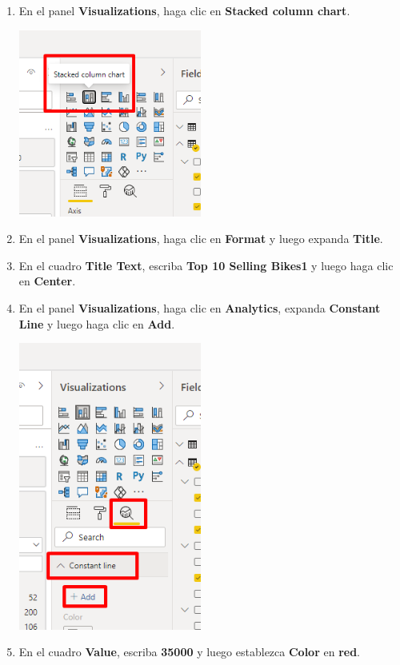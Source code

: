 \documentclass[12pt,letterpaper]{article}
\newcommand\tab[1][1cm]{\hspace*{#1}}
\begin{document}
\begin{enumerate}[\tab 1.]
\begin{center}
        \end{center}
        \item En el panel \textbf{Visualizations}, haga clic en \textbf{Stacked column chart}.
        \begin{center}
            \includegraphics[width=6cm]{./img/img111.png}
        \end{center}
        \item En el panel \textbf{Visualizations}, haga clic en \textbf{Format} y luego expanda \textbf{Title}.
        \item En el cuadro \textbf{Title Text}, escriba \textbf{Top 10 Selling Bikes1} y luego haga clic en \textbf{Center}.
        \item En el panel \textbf{Visualizations}, haga clic en \textbf{Analytics}, expanda \textbf{Constant Line} y luego haga clic en \textbf{Add}.
        \begin{center}
            \includegraphics[width=6cm]{./img/img114.png}
        \end{center}
        \item En el cuadro \textbf{Value}, escriba \textbf{35000} y luego establezca \textbf{Color} en \textbf{red}.

\end{enumerate}
\end{document}
